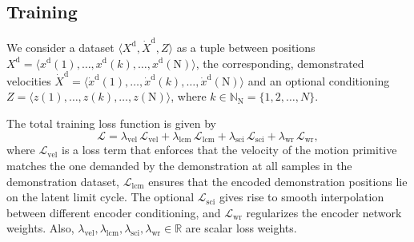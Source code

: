 \subsection{Training}
We consider a dataset $\langle X^\mathrm{d}, \dot{X}^\mathrm{d}, Z \rangle$ as a tuple between positions $X^\mathrm{d} = \langle x^\mathrm{d}(1), \dots, x^\mathrm{d}(k), \dots, x^\mathrm{d}(\mathrm{N}) \rangle$, the corresponding, demonstrated velocities $\dot{X}^\mathrm{d} = \langle \dot{x}^\mathrm{d}(1), \dots, \dot{x}^\mathrm{d}(k), \dots, \dot{x}^\mathrm{d}(\mathrm{N}) \rangle$ and an optional conditioning $Z = \langle z(1), \dots, z(k), \dots, z(\mathrm{N}) \rangle$, where $k \in \mathbb{N}_\mathrm{N} = \{1, 2, \dots, N \}$.

The total training loss function is given by
\begin{equation}
    \mathcal{L} = \lambda_\mathrm{vel} \, \mathcal{L}_\mathrm{vel} + \lambda_\mathrm{lcm} \, \mathcal{L}_\mathrm{lcm} + \lambda_\mathrm{sci} \, \mathcal{L}_{\mathrm{sci}} + \lambda_\mathrm{wr} \, \mathcal{L}_\mathrm{wr},
\end{equation}
where $\mathcal{L}_\mathrm{vel}$ is a loss term that enforces that the velocity of the motion primitive matches the one demanded by the demonstration at all samples in the demonstration dataset, $\mathcal{L}_\mathrm{lcm}$ ensures that the encoded demonstration positions lie on the latent limit cycle. The optional $\mathcal{L}_{\mathrm{sci}}$ gives rise to smooth interpolation between different encoder conditioning, and $\mathcal{L}_\mathrm{wr}$ regularizes the encoder network weights.
Also, $\lambda_\mathrm{vel}, \lambda_\mathrm{lcm}, \lambda_\mathrm{sci}, \lambda_\mathrm{wr} \in \mathbb{R}$ are scalar loss weights.

